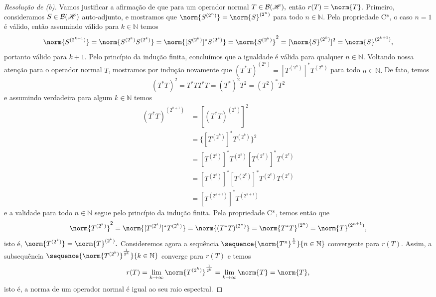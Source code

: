 \begin{proof}[Resolução de (b)]
  Vamos justificar a afirmação de que para um operador normal \(T \in \mathcal{B}(\mathscr{H}),\) então \(r(T) = \norm{T}\). Primeiro, consideramos \(S \in \mathcal{B}(\mathscr{H})\) auto-adjunto, e mostramos que \(\norm{S^{(2^n)}} = \norm{S}^{(2^n)}\) para todo \(n \in \mathbb{N}\). Pela propriedade C*, o caso \(n = 1\) é válido, então assumindo válido para \(k \in \mathbb{N}\) temos
  \begin{equation*}
    \norm{S^{(2^{k+1})}} = \norm{S^{(2^k)} S^{(2^k)}} = \norm{[S^{(2^k)}]^* S^{(2^k)}} = \norm{S^{(2^k)}}^2 = [\norm{S}^{(2^k)}]^2 = \norm{S}^{(2^{k+1})},
  \end{equation*}
  portanto válido para \(k + 1.\) Pelo princípio da indução finita, concluímos que a igualdade é válida para qualquer \(n \in \mathbb{N}.\)
  Voltando nossa atenção para o operador normal \(T\), mostramos por indução novamente que \((T^*T)^{(2^n)} = \left[T^{(2^n)}\right]^* T^{(2^n)}\) para todo \(n \in \mathbb{N}.\) De fato, temos
  \begin{equation*}
    (T^*T)^2 = T^*T T^*T = (T^*)^2 T^2 = (T^2)^*T^2
  \end{equation*}
  e assumindo verdadeira para algum \(k \in \mathbb{N}\) temos
  \begin{align*}
    (T^*T)^{(2^{k+1})} &= [(T^*T)^{(2^k)}]^2\\
                       &= \{[T^{(2^k)}]^*T^{(2^k)}\}^2\\
                       &= [T^{(2^k)}]^*T^{(2^k)}[T^{(2^k)}]^*T^{(2^k)}\\
                       &= [T^{(2^k)}]^*[T^{(2^k)}]^*T^{(2^k)}T^{(2^k)}\\
                       &= [T^{(2^{k+1})}]^*T^{(2^{k+1})}
  \end{align*}
  e a validade para todo \(n \in \mathbb{N}\) segue pelo princípio da indução finita. Pela propriedade C*, temos então que
  \begin{equation*}
    \norm{T^{(2^k)}}^2 = \norm{[T^{(2^k)}]^*T^{(2^k)}} = \norm{(T^*T)^{(2^n)}} = \norm{T^*T}^{(2^n)} = \norm{T}^{(2^{n+1})},
  \end{equation*}
  isto é, \(\norm{T^{(2^k)}} = \norm{T}^{(2^k)}.\)
  Consideremos agora a sequência \(\sequence{\norm{T^n}^{\frac1n}}{n\in \mathbb{N}}\) convergente para \(r(T)\). Assim, a subsequência \(\sequence{\norm{T^{(2^k)}}^{\frac{1}{2^k}}}{k \in \mathbb{N}}\) converge para \(r(T)\) e temos
  \begin{equation*}
    r(T) = \lim_{k \to \infty}{\norm{T^{(2^k)}}^{\frac1{2^k}}} = \lim_{k \to \infty}{\norm{T}} = \norm{T},
  \end{equation*}
  isto é, a norma de um operador normal é igual ao seu raio espectral.
\end{proof}

